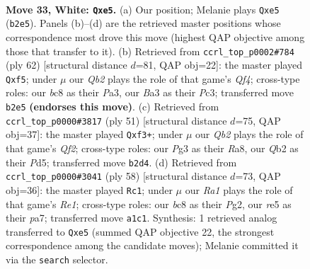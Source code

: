 \documentclass[11pt]{article}
\begin{document}
\clearpage

\begin{figure}[p]\centering
\begin{subfigure}{0.46\textwidth}\centering
\resizebox{\linewidth}{!}{%
\newchessgame
\chessboard[
  setfen={1nbq4/5p1k/1p1P1n2/4r1pp/p1P5/B5PP/PQ3P2/R5K1 w - - 0 33},
  showmover=false,
  pgfstyle=straightmove, color=movearrow, markmove={b2-e5}
]}
\caption{}
\end{subfigure}\hfill
\begin{subfigure}{0.46\textwidth}\centering
\resizebox{\linewidth}{!}{%
\newchessgame
\chessboard[
  setfen={r5k1/1qp2pp1/3p1n2/1p1P1b1p/5Q1P/P1P2BP1/P4P2/3R2K1 w - - 0 32},
  showmover=false,
  pgfstyle=straightmove, color=movearrow, markmove={f4-f5}
]}
\caption{}
\end{subfigure}
\\[4pt]
\begin{subfigure}{0.46\textwidth}\centering
\resizebox{\linewidth}{!}{%
\newchessgame
\chessboard[
  setfen={r1b3k1/2p2qp1/2p5/p1Np4/P2PP3/5P1p/1Q5P/R4B1K b - - 0 26},
  showmover=false,
  pgfstyle=straightmove, color=movearrow, markmove={f7-f3}
]}
\caption{}
\end{subfigure}\hfill
\begin{subfigure}{0.46\textwidth}\centering
\resizebox{\linewidth}{!}{%
\newchessgame
\chessboard[
  setfen={2r3k1/ppq2pp1/5n2/1PP2p1p/P7/BQ5P/6P1/4R1K1 w - - 0 30},
  showmover=false,
  pgfstyle=straightmove, color=movearrow, markmove={e1-c1}
]}
\caption{}
\end{subfigure}
\caption{\textbf{Move 33, White: \texttt{Qxe5}.} (a) Our position; Melanie plays \texttt{Qxe5} (\texttt{b2e5}). Panels (b)--(d) are the retrieved master positions whose correspondence most drove this move (highest QAP objective among those that transfer to it). (b) Retrieved from \texttt{ccrl\_top\_p0002\#784} (ply 62) [structural distance $d$=81, QAP obj=22]: the master played \texttt{Qxf5}; under $\mu$ our \emph{Qb2} plays the role of that game's \emph{Qf4}; cross-type roles: our \emph{b}c8 as their \emph{P}a3, our \emph{B}a3 as their \emph{P}c3; transferred move \texttt{b2e5} \textbf{(endorses this move)}. (c) Retrieved from \texttt{ccrl\_top\_p0000\#3817} (ply 51) [structural distance $d$=75, QAP obj=37]: the master played \texttt{Qxf3+}; under $\mu$ our \emph{Qb2} plays the role of that game's \emph{Qf2}; cross-type roles: our \emph{P}g3 as their \emph{R}a8, our \emph{Q}b2 as their \emph{P}d5; transferred move \texttt{b2d4}. (d) Retrieved from \texttt{ccrl\_top\_p0000\#3041} (ply 58) [structural distance $d$=73, QAP obj=36]: the master played \texttt{Rc1}; under $\mu$ our \emph{Ra1} plays the role of that game's \emph{Re1}; cross-type roles: our \emph{b}c8 as their \emph{P}g2, our \emph{r}e5 as their \emph{p}a7; transferred move \texttt{a1c1}. Synthesis: 1 retrieved analog transferred to \texttt{Qxe5} (summed QAP objective 22, the strongest correspondence among the candidate moves); Melanie committed it via the \texttt{search} selector.}
\label{fig:thought-m64}
\end{figure}
\end{document}
